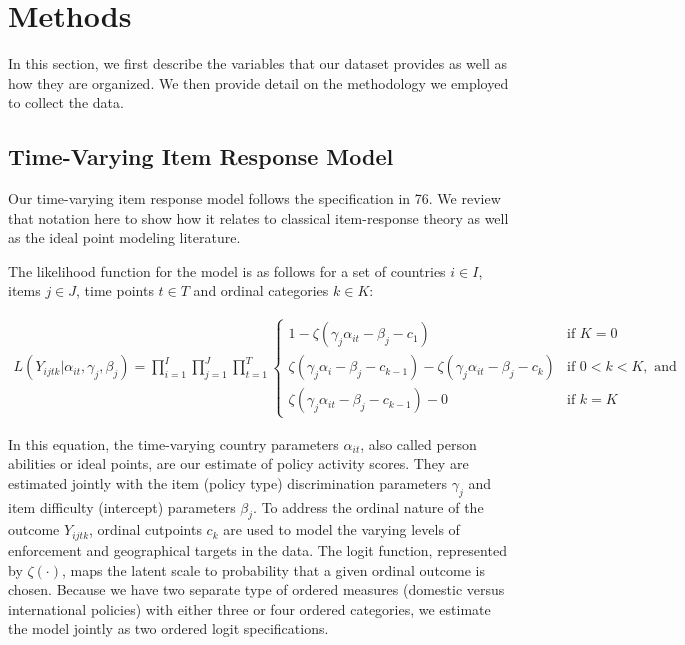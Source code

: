 \documentclass[
]{article}
\begin{document}
\hypertarget{methods}{%
\section*{Methods}\label{methods}}

In this section, we first describe the variables that our dataset provides as well as how they are organized. We then provide detail on the methodology we employed to collect the data.

\hypertarget{time-varying-item-response-model}{%
\subsection*{Time-Varying Item Response Model}\label{time-varying-item-response-model}}

Our time-varying item response model follows the specification in 76. We review that notation here to show how it relates to classical item-response theory as well as the ideal point modeling literature.

The likelihood function for the model is as follows for a set of countries \(i \in I\), items \(j \in J\), time points \(t \in T\) and ordinal categories \(k \in K\):

\begin{align}
    L(Y_{ijtk}|\alpha_{it},\gamma_j,\beta_j) =  \prod_{i=1}^{I} \prod_{j=1}^{J} \prod_{t=1}^{T}
    \begin{cases} 
    1 -  \zeta(\gamma_j \alpha_{it} - \beta_j - c_1) & \text{if } K = 0 \\
    \zeta(\gamma_j \alpha_i - \beta_j - c_{k-1}) - \zeta(\gamma_j \alpha_{it} - \beta_j - c_{k})       & \text{if } 0 < k < K, \text{ and} \\
    \zeta(\gamma_j \alpha_{it} - \beta_j - c_{k-1}) - 0 & \text{if } k=K
    \end{cases}
\label{eq:basic}
\end{align}

In this equation, the time-varying country parameters \(\alpha_{it}\), also called person abilities or ideal points, are our estimate of policy activity scores. They are estimated jointly with the item (policy type) discrimination parameters \(\gamma_j\) and item difficulty (intercept) parameters \(\beta_j\). To address the ordinal nature of the outcome \(Y_{ijtk}\), ordinal cutpoints \(c_{k}\) are used to model the varying levels of enforcement and geographical targets in the data. The logit function, represented by \(\zeta(\cdot)\), maps the latent scale to probability that a given ordinal outcome is chosen. Because we have two separate type of ordered measures (domestic versus international policies) with either three or four ordered categories, we estimate the model jointly as two ordered logit specifications.
\end{document}

